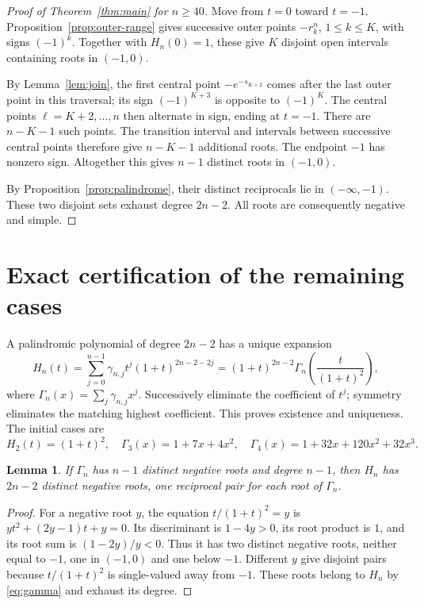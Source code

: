 \documentclass[11pt,letterpaper]{article}
\numberwithin{equation}{section}
\newtheorem{lemma}[theorem]{Lemma}
\begin{document}
\begin{proof}[Proof of Theorem~\ref{thm:main} for $n\ge40$]
Move from $t=0$ toward $t=-1$. Proposition~\ref{prop:outer-range} gives successive outer points $-r_k^n$, $1\le k\le K$, with signs $(-1)^k$. Together with $H_n(0)=1$, these give $K$ disjoint open intervals containing roots in $(-1,0)$.

By Lemma~\ref{lem:join}, the first central point $-e^{-s_{K+2}}$ comes after the last outer point in this traversal; its sign $(-1)^{K+3}$ is opposite to $(-1)^K$. The central points $\ell=K+2,\ldots,n$ then alternate in sign, ending at $t=-1$. There are $n-K-1$ such points. The transition interval and intervals between successive central points therefore give $n-K-1$ additional roots. The endpoint $-1$ has nonzero sign. Altogether this gives $n-1$ distinct roots in $(-1,0)$.

By Proposition~\ref{prop:palindrome}, their distinct reciprocals lie in $(-\infty,-1)$. These two disjoint sets exhaust degree $2n-2$. All roots are consequently negative and simple.
\end{proof}

\section{Exact certification of the remaining cases}\label{sec:finite}
A palindromic polynomial of degree $2n-2$ has a unique expansion
\begin{equation}\label{eq:gamma}
 H_n(t)=\sum_{j=0}^{n-1}\gamma_{n,j}t^j(1+t)^{2n-2-2j}
 =(1+t)^{2n-2}\Gamma_n\left(\frac{t}{(1+t)^2}\right),
\end{equation}
where $\Gamma_n(x)=\sum_j\gamma_{n,j}x^j$. Successively eliminate the coefficient of $t^j$; symmetry eliminates the matching highest coefficient. This proves existence and uniqueness. The initial cases are
\[
 H_2(t)=(1+t)^2,\quad \Gamma_3(x)=1+7x+4x^2,\quad
 \Gamma_4(x)=1+32x+120x^2+32x^3.
\]
\begin{lemma}\label{lem:gamma-roots}
If $\Gamma_n$ has $n-1$ distinct negative roots and degree $n-1$, then $H_n$ has $2n-2$ distinct negative roots, one reciprocal pair for each root of $\Gamma_n$.
\end{lemma}
\begin{proof}
For a negative root $y$, the equation $t/(1+t)^2=y$ is
$yt^2+(2y-1)t+y=0$. Its discriminant is $1-4y>0$, its root product is $1$, and its root sum is $(1-2y)/y<0$. Thus it has two distinct negative roots, neither equal to $-1$, one in $(-1,0)$ and one below $-1$. Different $y$ give disjoint pairs because $t/(1+t)^2$ is single-valued away from $-1$. These roots belong to $H_n$ by \eqref{eq:gamma} and exhaust its degree.
\end{proof}
\end{document}
